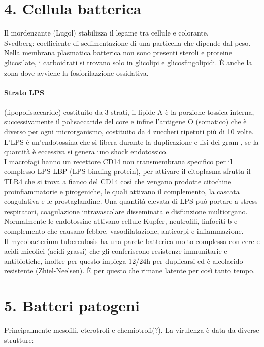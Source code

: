 \documentclass[10pt]{article}
\begin{document}
\section*{4. Cellula batterica}
Il mordenzante (Lugol) stabilizza il legame tra cellule e colorante.\\
Svedberg: coefficiente di sedimentazione di una particella che dipende dal peso.\\
Nella membrana plasmatica batterica non sono presenti steroli e proteine glicosilate, i carboidrati si trovano solo in glicolipi e glicosfingolipidi. È anche la zona dove avviene la fosforilazzione ossidativa.
\paragraph*{Strato LPS} (lipopolisaccaride) costituito da 3 strati, il lipide A è la porzione tossica interna, successivamente il polisaccaride del core e infine l'antigene O (somatico) che è diverso per ogni microrganismo, costituito da 4 zuccheri ripetuti più di 10 volte. L'LPS è un'endotossina che si libera durante la duplicazione e lisi dei gram-, se la quantità è eccessiva si genera uno \underline{shock endotossico}.\\
I macrofagi hanno un recettore CD14 non transmembrana specifico per il complesso LPS-LBP (LPS binding protein), per attivare il citoplasma sfrutta il TLR4 che si trova a fianco del CD14 così che vengano prodotte citochine proinfiammatorie e pirogeniche, le quali attivano il complemento, la cascata coagulativa e le prostaglandine. Una quantità elevata di LPS può portare a stress respiratori, \underline{coagulazione intravascolare disseminata} e disfunzione multiorgano.\\
Normalmente le endotossine attivano cellule Kupfer, neutrofili, linfociti b e complemento che causano febbre, vasodilatazione, anticorpi e infiammazione.\\
Il \underline{mycobacterium tuberculosis} ha una parete batterica molto complessa con cere e acidi micolici (acidi grassi) che gli conferiscono resistenze immunitarie e antibiotiche, inoltre per questo impiega 12/24h per duplicarsi ed è alcolacido resistente (Zhiel-Neelsen). È per questo che rimane latente per così tanto tempo.
\section*{5. Batteri patogeni}
Principalmente mesofili, eterotrofi e chemiotrofi(?). La virulenza è data da diverse strutture:
\end{document}
